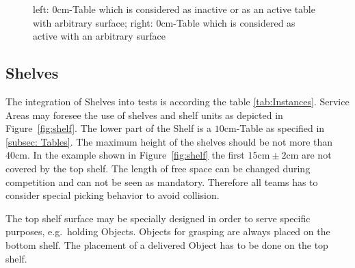 \begin{figure} [h!]
		\begin{center}
			 \hspace{0.2cm}
		\end{center}
	\caption{left: $0\si{\centi\meter}$-Table which is considered as inactive or as an active table with arbitrary surface; right: $0\si{\centi\meter}$-Table which is considered as active with an arbitrary surface}
	\label{fig:0cmws}
\end{figure}

\subsection{Shelves}\label{sec:Shelves}

The integration of Shelves into tests is according the table \ref{tab:Instances}. Service Areas may foresee the use of shelves and shelf units as depicted in Figure~\ref{fig:shelf}. The lower part of the Shelf is a $10\si{\centi\meter}$-Table as specified in \ref{subsec: Tables}.
The maximum height of the shelves should be not more than $40\si{\centi\meter}$. In the example shown in Figure~\ref{fig:shelf} the first $15 \si{\centi\meter}\pm 2\si{\centi\meter} $ are not covered by the top shelf. The length of free space can be changed during competition and can not be seen as mandatory. Therefore all teams has to consider special picking behavior to avoid collision.  

The top shelf surface may be specially designed in order to serve specific purposes, e.g.\, holding Objects. Objects for grasping are always placed on the bottom shelf. The placement of a delivered Object has to be done on the top shelf.  

